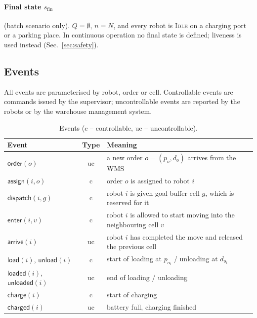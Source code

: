 \documentclass[11pt,a4paper]{article}
\newcommand{\ev}[1]{\mathsf{#1}}            %
\newcommand{\md}[1]{\textsc{#1}}            %
\begin{document}
\paragraph{Final state $s_{\mathrm{fin}}$} (batch scenario only).
$Q=\emptyset$, $n=N$, and every robot is \md{Idle} on a charging port or a
parking place. In continuous operation no final state is defined; liveness is
used instead (Sec.~\ref{sec:safety}).

\subsection{Events}

All events are parameterised by robot, order or cell. Controllable events are
commands issued by the supervisor; uncontrollable events are reported by the
robots or by the warehouse management system.

\begin{table}[H]
\centering\small
\begin{tabularx}{\textwidth}{@{}l c X@{}}
\toprule
Event & Type & Meaning \\
\midrule
$\ev{order}(o)$         & uc & a new order $o=(p_o,d_o)$ arrives from the WMS \\
$\ev{assign}(i,o)$      & c  & order $o$ is assigned to robot $i$ \\
$\ev{dispatch}(i,g)$    & c  & robot $i$ is given goal buffer cell $g$, which is reserved for it \\
$\ev{enter}(i,v)$       & c  & robot $i$ is allowed to start moving into the neighbouring cell $v$ \\
$\ev{arrive}(i)$        & uc & robot $i$ has completed the move and released the previous cell \\
$\ev{load}(i)$, $\ev{unload}(i)$ & c & start of loading at $p_{o_i}$ / unloading at $d_{o_i}$ \\
$\ev{loaded}(i)$, $\ev{unloaded}(i)$ & uc & end of loading / unloading \\
$\ev{charge}(i)$        & c  & start of charging \\
$\ev{charged}(i)$       & uc & battery full, charging finished \\
\bottomrule
\end{tabularx}
\caption{Events (c -- controllable, uc -- uncontrollable).}
\label{tab:events}
\end{table}
\end{document}
